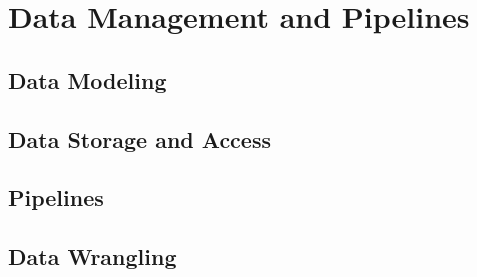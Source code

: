 \section{Data Management and Pipelines}
\subsection{Data Modeling}
\subsection{Data Storage and Access}
\subsection{Pipelines}
\subsection{Data Wrangling}
